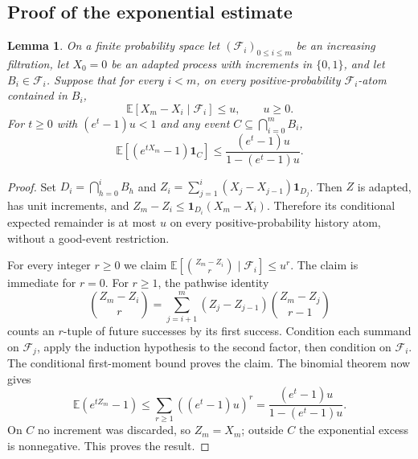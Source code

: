 \documentclass[11pt]{article}
\numberwithin{equation}{section}
\newtheorem{lemma}[theorem]{Lemma}
\theoremstyle{definition}
\theoremstyle{remark}
\newcommand{\E}{\mathbb E}
\newcommand{\1}{\mathbf 1}
\begin{document}
\subsection{Proof of the exponential estimate}
\begin{lemma}%
\label{lem:upper-adapted}
On a finite probability space let $(\mathcal F_i)_{0\le i\le m}$
be an increasing filtration, let $X_0=0$ be an adapted process with
increments in $\{0,1\}$, and let $B_i\in\mathcal F_i$.
Suppose that for every $i<m$, on every positive-probability
$\mathcal F_i$-atom contained in $B_i$,
\[
 \E[X_m-X_i\mid\mathcal F_i]\le u,
 \qquad u\ge0.
\]
For $t\ge0$ with $(e^t-1)u<1$ and any event
$C\subseteq\bigcap_{i=0}^m B_i$,
\begin{equation}\label{eq:upper-adapted}
 \E[(e^{tX_m}-1)\mathbf1_C]
                  \le\frac{(e^t-1)u}{1-(e^t-1)u}.
\end{equation}
\end{lemma}
\begin{proof}
Set $D_i=\bigcap_{h=0}^iB_h$ and
$Z_i=\sum_{j=1}^i(X_j-X_{j-1})\mathbf1_{D_j}$.
Then $Z$ is adapted, has unit increments, and
$Z_m-Z_i\le\mathbf1_{D_i}(X_m-X_i)$. Therefore its conditional
expected remainder is at most $u$ on every positive-probability
history atom, without a good-event restriction.

For every integer $r\ge0$ we claim
$\E[\binom{Z_m-Z_i}{r}\mid\mathcal F_i]\le u^r$.
The claim is immediate for $r=0$. For $r\ge1$, the pathwise identity
\[
 \binom{Z_m-Z_i}{r}=
 \sum_{j=i+1}^m(Z_j-Z_{j-1})\binom{Z_m-Z_j}{r-1}
\]
counts an $r$-tuple of future successes by its first success.
Condition each summand on $\mathcal F_j$, apply the induction
hypothesis to the second factor, then condition on $\mathcal F_i$.
The conditional first-moment bound proves the claim.
The binomial theorem now gives
\[
 \E(e^{tZ_m}-1)
 \le\sum_{r\ge1}((e^t-1)u)^r
       =\frac{(e^t-1)u}{1-(e^t-1)u}.
\]
On $C$ no increment was discarded, so $Z_m=X_m$; outside $C$
the exponential excess is nonnegative. This proves the result.
\end{proof}
\end{document}
